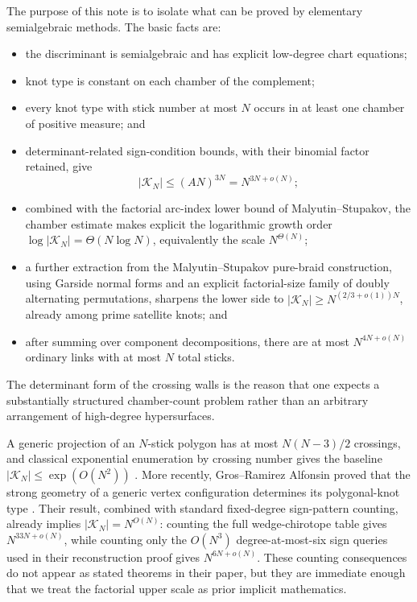 \documentclass[11pt]{article}
\theoremstyle{remark}
\theoremstyle{plain}
\newcommand{\Kcal}{\mathcal{K}}
\begin{document}
The purpose of this note is to isolate what can be proved by elementary
semialgebraic methods.  The basic facts are:
\begin{itemize}
    \item the discriminant is semialgebraic and has explicit low-degree chart
    equations;
    \item knot type is constant on each chamber of the complement;
    \item every knot type with stick number at most \(N\) occurs in at least one
    chamber of positive measure; and
    \item determinant-related sign-condition bounds, with their binomial
    factor retained, give
    \[
        |\Kcal_N|\le (A N)^{3N}=N^{3N+o(N)};
    \]
    \item combined with the factorial arc-index lower bound of
    Malyutin--Stupakov, the chamber estimate makes explicit the logarithmic growth
    order
    \(\log|\Kcal_N|=\Theta(N\log N)\), equivalently the scale
    \(N^{\Theta(N)}\);
    \item a further extraction from the Malyutin--Stupakov pure-braid
    construction, using Garside normal forms and an explicit factorial-size
    family of doubly alternating permutations, sharpens the lower side to
    \(|\Kcal_N|\ge N^{(2/3+o(1))N}\), already among prime satellite knots;
    and
    \item after summing over component decompositions, there are at most
    \(N^{4N+o(N)}\) ordinary links with at most \(N\) total sticks.
\end{itemize}
The determinant form of the crossing walls is the reason that one expects a
substantially structured chamber-count problem rather than an arbitrary
arrangement of high-degree hypersurfaces.

A generic projection of an \(N\)-stick polygon has at most \(N(N-3)/2\)
crossings, and classical exponential enumeration by crossing number gives the
baseline \(|\Kcal_N|\le\exp(O(N^2))\) \cite{FreedmanHeWang}.  More recently,
Gros--Ramirez Alfonsin proved that the strong geometry of a generic vertex
configuration determines its polygonal-knot type \cite{GrosRamirez}.  Their
result, combined with standard fixed-degree sign-pattern counting, already
implies \(|\Kcal_N|=N^{O(N)}\): counting the full wedge-chirotope table gives
\(N^{33N+o(N)}\), while counting only the \(O(N^3)\) degree-at-most-six sign
queries used in their reconstruction proof gives \(N^{6N+o(N)}\).  These
counting consequences do not appear as stated theorems in their paper, but
they are immediate enough that we treat the factorial upper scale as prior
implicit mathematics.
\end{document}
